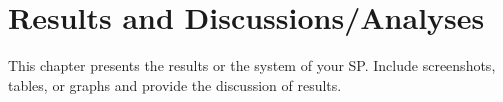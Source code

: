 \chapter{Results and Discussions/Analyses}
This chapter  presents the results or  the system  of your SP.  Include screenshots, tables, or graphs and provide the discussion of results.